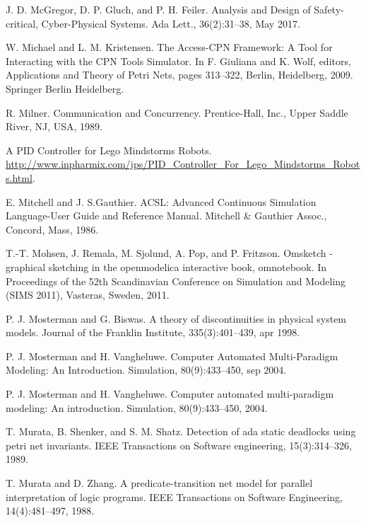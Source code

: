 \begin{description}[style=nextline,leftmargin=12mm,labelwidth=10mm,font=\normalfont]
\item[{[205]}] J. D. McGregor, D. P. Gluch, and P. H. Feiler. Analysis and Design of Safety-critical, Cyber-Physical Systems. Ada Lett., 36(2):31–38, May 2017.

\item[{[206]}] W. Michael and L. M. Kristensen. The Access-CPN Framework: A Tool for Interacting with the CPN Tools Simulator. In F. Giuliana and K. Wolf, editors, Applications and Theory of Petri Nets, pages 313–322, Berlin, Heidelberg, 2009. Springer Berlin Heidelberg.

\item[{[207]}] R. Milner. Communication and Concurrency. Prentice-Hall, Inc., Upper Saddle River, NJ, USA, 1989.

\item[{[208]}] A PID Controller for Lego Mindstorms Robots. \url{http://www.inpharmix.com/jps/PID_Controller_For_Lego_Mindstorms_Robots.html}.

\item[{[209]}] E. Mitchell and J. S.Gauthier. ACSL: Advanced Continuous Simulation Language-User Guide and Reference Manual. Mitchell \& Gauthier Assoc., Concord, Mass, 1986.

\item[{[210]}] T.-T. Mohsen, J. Remala, M. Sjolund, A. Pop, and P. Fritzson. Omsketch - graphical sketching in the openmodelica interactive book, omnotebook. In Proceedings of the 52th Scandinavian Conference on Simulation and Modeling (SIMS 2011), Vasteras, Sweden, 2011.

\item[{[211]}] P. J. Mosterman and G. Biswas. A theory of discontinuities in physical system models. Journal of the Franklin Institute, 335(3):401–439, apr 1998.

\item[{[212]}] P. J. Mosterman and H. Vangheluwe. Computer Automated Multi-Paradigm Modeling: An Introduction. Simulation, 80(9):433–450, sep 2004.

\item[{[213]}] P. J. Mosterman and H. Vangheluwe. Computer automated multi-paradigm modeling: An introduction. Simulation, 80(9):433–450, 2004.

\item[{[214]}] T. Murata, B. Shenker, and S. M. Shatz. Detection of ada static deadlocks using petri net invariants. IEEE Transactions on Software engineering, 15(3):314–326, 1989.

\item[{[215]}] T. Murata and D. Zhang. A predicate-transition net model for parallel interpretation of logic programs. IEEE Transactions on Software Engineering, 14(4):481–497, 1988.


\end{description}
